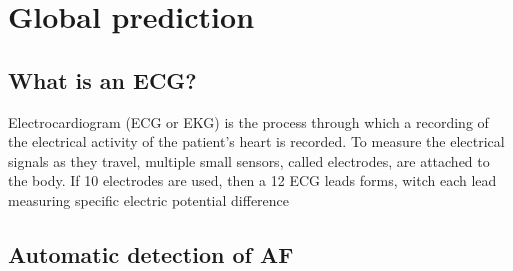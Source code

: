\chapter{Global prediction}
\label{sec:global}

\section{What is an ECG?}
\lipsum[4]

Electrocardiogram (ECG or EKG) is the process through which a recording of the electrical activity of the patient's heart is recorded. To measure the electrical signals as they travel, multiple small sensors, called electrodes, are attached to the body. If 10 electrodes are used, then a 12 ECG leads forms, witch each lead measuring specific electric potential difference

\section{Automatic detection of AF}

\section{}